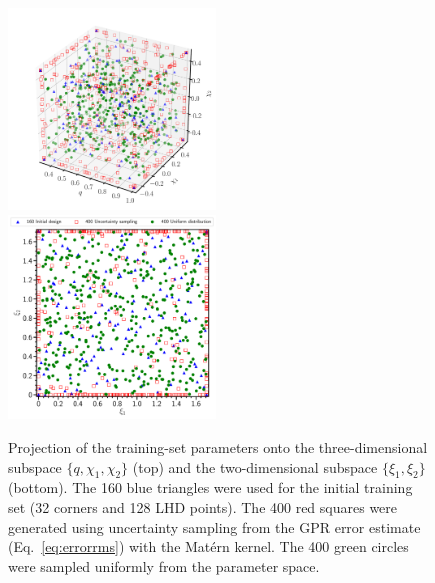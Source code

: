 \documentclass[prd,aps,letter,twocolumn,floatfix,notitlepage,nofootinbib]{revtex4-1}
\begin{document}
\begin{figure}[htb]
\centering
\includegraphics[width=0.49\textwidth]{trainingset3d.pdf}\\
\includegraphics[width=0.49\textwidth]{trainingset2d.pdf}
\caption{Projection of the training-set parameters onto the three-dimensional subspace $\{q, \chi_1, \chi_2\}$ (top) and the two-dimensional subspace $\{\xi_1, \xi_2\}$ (bottom). The 160 blue triangles were used for the initial training set (32 corners and 128 LHD points). The 400 red squares were generated using uncertainty sampling from the GPR error estimate (Eq.~\eqref{eq:errorrms}) with the Mat\'{e}rn kernel. The 400 green circles were sampled uniformly from the parameter space.}
\label{fig:LHD}
\end{figure}
\end{document}
